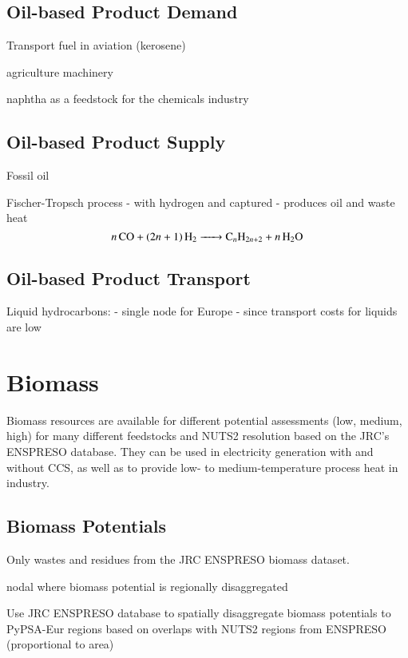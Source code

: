 \subsection{Oil-based Product Demand}

Transport fuel in aviation (kerosene)

agriculture machinery

naphtha as a feedstock for the chemicals industry

\subsection{Oil-based Product Supply}

Fossil oil

Fischer-Tropsch process
- with hydrogen and captured \co{}
- produces oil and waste heat
\begin{equation}
    \ce{$n$CO + ($2n$ + 1)H2 -> C_$n$H_{2n+2} + $n$H2O}
\end{equation}


\subsection{Oil-based Product Transport}

Liquid hydrocarbons:
- single node for Europe
- since transport costs for liquids are low


\section{Biomass}

Biomass resources are available for different potential assessments (low,
medium, high) for many different feedstocks and NUTS2 resolution based on the
JRC’s ENSPRESO database. They can be used in electricity generation with and
without CCS, as well as to provide low- to medium-temperature process heat in
industry.

\subsection{Biomass Potentials}

Only wastes and residues from the JRC ENSPRESO biomass dataset.

nodal where biomass potential is regionally disaggregated

Use JRC ENSPRESO database to spatially disaggregate biomass potentials to
PyPSA-Eur regions based on overlaps with NUTS2 regions from ENSPRESO
(proportional to area)

